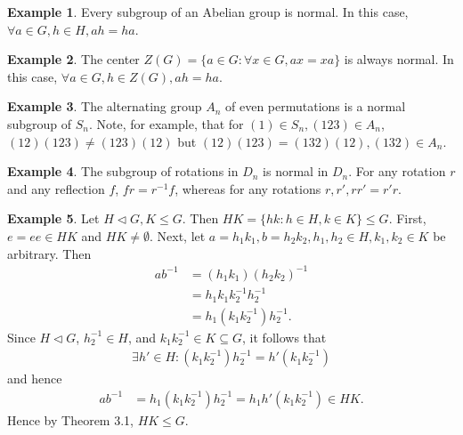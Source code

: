 \documentclass{article}
\theoremstyle{definition}
\newtheorem{example}{Example}[section]
\begin{document}
     \begin{example}
        Every subgroup of an Abelian group is normal. In this case, $\forall a \in G, h \in H, ah=ha$.
     \end{example}
     
     \begin{example}
        The center $Z(G) = \{a \in G: \forall x \in G, ax=xa\}$ is always normal. In this case, $\forall a \in G, h \in Z(G), ah=ha$.
     \end{example}
     
     \begin{example}
        The alternating group $A_n$ of even permutations is a normal subgroup of $S_n$. Note, for example, that for $(1) \in S_n, (123) \in A_n$, $(12)(123) \neq (123)(12)$ but $(12)(123) = (132)(12), (132) \in A_n$.
     \end{example}
     
     \begin{example}
        The subgroup of rotations in $D_n$ is normal in $D_n$. For any rotation $r$ and any reflection $f$, $fr=r^{-1}f$, whereas for any rotations $r,r',rr'=r'r$.
     \end{example}
     
     \begin{example}
        Let $H \lhd G, K \leq G$. Then $HK = \{hk: h \in H, k \in K\} \leq G$. First, $e=ee \in HK$ and $HK \neq \emptyset$. Next, let $a=h_1k_1,b=h_2k_2, h_1,h_2 \in H, k_1,k_2 \in K$ be arbitrary. Then
        \begin{align*}
            ab^{-1} &= (h_1k_1)(h_2k_2)^{-1} \\
            &= h_1k_1k_2^{-1}h_2^{-1} \\
            &= h_1(k_1k_2^{-1})h_2^{-1}.
        \end{align*}
        Since $H \lhd G$, $h_2^{-1} \in H$, and $k_1k_2^{-1} \in K \subseteq G$, it follows that
        \begin{align*}
            \exists h' \in H: (k_1k_2^{-1})h_2^{-1}
            = h'(k_1k_2^{-1})
        \end{align*}
        and hence
        \begin{align*}
            ab^{-1} &= h_1(k_1k_2^{-1})h_2^{-1} = h_1h'(k_1k_2^{-1}) \in HK.
        \end{align*}
        Hence by Theorem 3.1, $HK \leq G$.
     \end{example}
     
\end{document}
